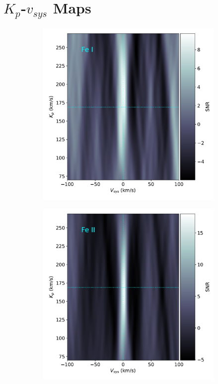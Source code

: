 \documentclass[twocolumn]{aastex631}
\begin{document}
        \section{$K_p$-$v_{sys}$ Maps}
            \begin{figure}[ht!]\label{fig:kp-vsys-maps}
                \begin{subfigure}[b]{0.3\textwidth}
                    \centering
                    \includegraphics[width=\textwidth]{plots-updated/kp-vsys-map/combined/KELT-20b.20190504.combined.Fe.CCFs-shifted.pdf}
                \end{subfigure}
                \begin{subfigure}[b]{0.3\textwidth}
                    \centering
                    \includegraphics[width=\textwidth]{plots-updated/kp-vsys-map/combined/KELT-20b.20190504.combined.Fe+.CCFs-shifted.pdf}

\end{subfigure}
\end{figure}
\end{document}
